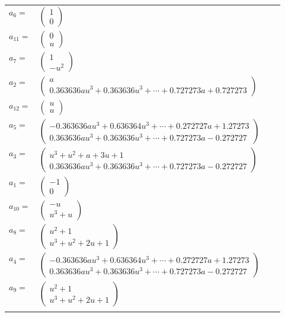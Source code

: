 \documentclass[1p]{elsarticle_modified}
\theoremstyle{definition}
\begin{document}
\begin{tabular}{m{7pt} m{180pt} m{7pt} m{180pt} }
\flushright $a_{6}=$&$\begin{pmatrix}1\\0\end{pmatrix}$ \\
\flushright $a_{11}=$&$\begin{pmatrix}0\\u\end{pmatrix}$ \\
\flushright $a_{7}=$&$\begin{pmatrix}1\\- u^2\end{pmatrix}$ \\
\flushright $a_{2}=$&$\begin{pmatrix}a\\0.363636 a u^{3}+0.363636 u^{3}+\cdots+0.727273 a+0.727273\end{pmatrix}$ \\
\flushright $a_{12}=$&$\begin{pmatrix}u\\u\end{pmatrix}$ \\
\flushright $a_{5}=$&$\begin{pmatrix}-0.363636 a u^{3}+0.636364 u^{3}+\cdots+0.272727 a+1.27273\\0.363636 a u^{3}+0.363636 u^{3}+\cdots+0.727273 a-0.272727\end{pmatrix}$ \\
\flushright $a_{3}=$&$\begin{pmatrix}u^3+u^2+a+3 u+1\\0.363636 a u^{3}+0.363636 u^{3}+\cdots+0.727273 a-0.272727\end{pmatrix}$ \\
\flushright $a_{1}=$&$\begin{pmatrix}-1\\0\end{pmatrix}$ \\
\flushright $a_{10}=$&$\begin{pmatrix}- u\\u^3+u\end{pmatrix}$ \\
\flushright $a_{8}=$&$\begin{pmatrix}u^2+1\\u^3+u^2+2 u+1\end{pmatrix}$ \\
\flushright $a_{4}=$&$\begin{pmatrix}-0.363636 a u^{3}+0.636364 u^{3}+\cdots+0.272727 a+1.27273\\0.363636 a u^{3}+0.363636 u^{3}+\cdots+0.727273 a-0.272727\end{pmatrix}$ \\
\flushright $a_{9}=$&$\begin{pmatrix}u^2+1\\u^3+u^2+2 u+1\end{pmatrix}$\\&\end{tabular}
\end{document}
